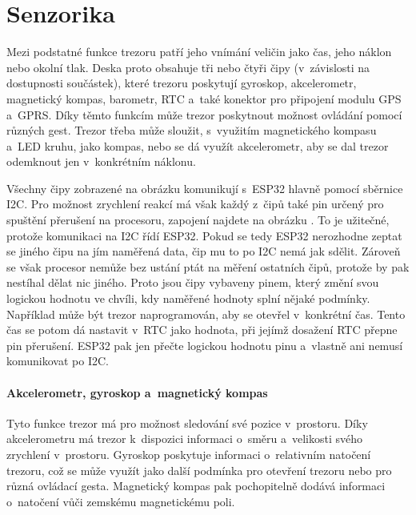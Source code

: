 \vspace{-3mm}
\section{Senzorika}
\vspace{-3mm}
Mezi podstatné funkce trezoru patří jeho vnímání veličin jako čas, jeho náklon nebo okolní tlak.
Deska proto obsahuje tři nebo čtyři čipy (v~závislosti na dostupnosti součástek), které trezoru poskytují gyroskop, akcelerometr, 
magnetický kompas,
barometr, RTC a~také konektor pro připojení modulu GPS a~GPRS. Díky těmto funkcím může trezor poskytnout možnost ovládání 
pomocí různých gest. 
Trezor třeba může sloužit, s~využitím magnetického kompasu a~LED kruhu, jako kompas, nebo se dá využít akcelerometr, 
aby se dal trezor odemknout jen v~konkrétním náklonu. 

Všechny čipy zobrazené na obrázku  komunikují s~ESP32 hlavně pomocí 
sběrnice I2C. Pro možnost zrychlení reakcí má však každý z~čipů také pin určený pro spuštění přerušení na procesoru, zapojení najdete na obrázku . 
To je užitečné, protože komunikaci na I2C řídí ESP32. Pokud se tedy ESP32 nerozhodne zeptat se jiného čipu 
na jím naměřená data, čip mu to po I2C nemá 
jak sdělit. Zároveň se však procesor nemůže bez ustání ptát na měření ostatních čipů, protože by pak nestíhal dělat nic jiného. Proto jsou čipy vybaveny 
pinem, který změní svou logickou hodnotu ve chvíli, kdy naměřené hodnoty splní nějaké podmínky. 
Například může být trezor naprogramován, aby se otevřel 
v~konkrétní čas. Tento čas se potom dá nastavit v~RTC jako hodnota, při jejímž dosažení RTC přepne pin přerušení. ESP32 pak jen přečte logickou hodnotu 
pinu a~vlastně ani nemusí komunikovat po I2C.

\paragraph{Akcelerometr, gyroskop a~magnetický kompas}
Tyto funkce trezor má pro možnost sledování své pozice v~prostoru. 
Díky akcelerometru má trezor k~dispozici informaci o~směru a~velikosti svého zrychlení v~prostoru.
Gyroskop poskytuje informaci o~relativním natočení trezoru, což se může využít jako další podmínka pro otevření trezoru nebo pro různá ovládací gesta.
Magnetický kompas pak pochopitelně dodává informaci o~natočení vůči zemskému magnetickému poli.

